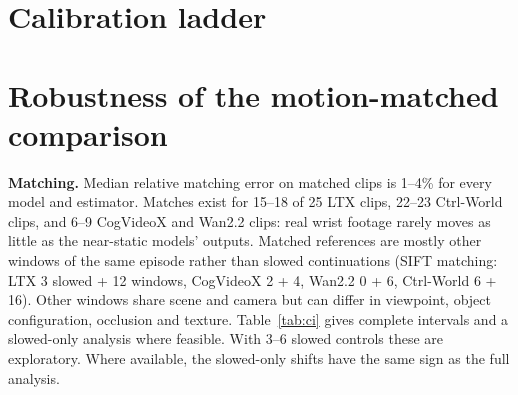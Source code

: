 \documentclass{article}
\begin{document}
\section{Calibration ladder}
\label{app:calib}
\begin{table}[h]
\centering
\scriptsize
\setlength{\tabcolsep}{3pt}

\vspace{4pt}
\caption{Calibration ladder at the main settings (5\,fps, 0.4\,s pairs, the 25 shared clips). ``--'':
too few frames register.}
\label{tab:calib}
\end{table}

\section{Robustness of the motion-matched comparison}
\label{app:robust}
\begin{table}[h]
\centering
\scriptsize

\vspace{4pt}
\caption{VGGT depth disagreement, model $-$ real continuation $\to$ model $-$ motion-matched real
footage, on the same matched clips, at three frame-pair gaps and with two matching estimators (25
shared clips). $^*$: 95\% bootstrap CI excludes zero.}
\label{tab:robust}
\end{table}
\textbf{Matching.} Median relative matching error on matched clips is 1--4\% for every model and
estimator. Matches exist for 15--18 of 25 LTX clips, 22--23 Ctrl-World clips, and 6--9 CogVideoX and
Wan2.2 clips: real wrist footage rarely moves as little as the near-static models' outputs. Matched
references are mostly other windows of the same episode rather than slowed continuations (SIFT
matching: LTX 3 slowed + 12 windows, CogVideoX 2 + 4, Wan2.2 0 + 6, Ctrl-World 6 + 16). Other windows
share scene and camera but can differ in viewpoint, object configuration, occlusion and texture.
Table~\ref{tab:ci} gives complete intervals and a slowed-only analysis where feasible. With 3--6
slowed controls these are exploratory. Where available, the slowed-only shifts have the same sign as
the full analysis.

\begin{table}[h]
\centering
\scriptsize
\setlength{\tabcolsep}{3pt}
\resizebox{\linewidth}{!}{}
\vspace{4pt}
\caption{VGGT depth disagreement at 0.4\,s on the 25 shared clips, mean [95\% bootstrap CI]. Raw:
model $-$ real continuation. Matched: model $-$ motion-matched reference. Shift: matched reference
$-$ real continuation, which equals raw $-$ matched. A negative shift means the model looks worse
against the motion-matched reference than against the real continuation. Controls: number of slowed
continuations + other episode windows. ``--'': fewer than three clips.}
\label{tab:ci}
\end{table}
\end{document}

